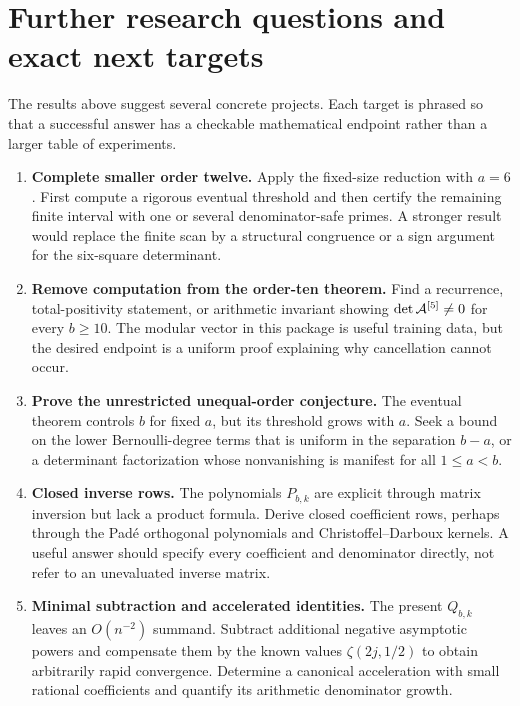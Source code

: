 \section{Further research questions and exact next targets}
\label{sec:research}

The results above suggest several concrete projects.  Each target is
phrased so that a successful answer has a checkable mathematical
endpoint rather than a larger table of experiments.

\begin{enumerate}[label=\textbf{R\arabic*.},leftmargin=*]
\item \textbf{Complete smaller order twelve.}
Apply the fixed-size reduction with $a=6$.  First compute a rigorous
eventual threshold and then certify the remaining finite interval with
one or several denominator-safe primes.  A stronger result would replace
the finite scan by a structural congruence or a sign argument for the
six-square determinant.

\item \textbf{Remove computation from the order-ten theorem.}
Find a recurrence, total-positivity statement, or arithmetic invariant
showing $\det\mathcal{A}^{[5]}\ne0$ for every $b\ge10$.  The modular vector in
this package is useful training data, but the desired endpoint is a
uniform proof explaining why cancellation cannot occur.

\item \textbf{Prove the unrestricted unequal-order conjecture.}
The eventual theorem controls $b$ for fixed $a$, but its threshold grows
with $a$.  Seek a bound on the lower Bernoulli-degree terms that is
uniform in the separation $b-a$, or a determinant factorization whose
nonvanishing is manifest for all $1\le a<b$.

\item \textbf{Closed inverse rows.}
The polynomials $P_{b,k}$ are explicit through matrix inversion but lack
a product formula.  Derive closed coefficient rows, perhaps through the
Pad\'e orthogonal polynomials and Christoffel--Darboux kernels.  A useful
answer should specify every coefficient and denominator directly, not
refer to an unevaluated inverse matrix.

\item \textbf{Minimal subtraction and accelerated identities.}
The present $Q_{b,k}$ leaves an $O(n^{-2})$ summand.  Subtract additional
negative asymptotic powers and compensate them by the known values
$\zeta(2j,1/2)$ to obtain arbitrarily rapid convergence.  Determine a
canonical acceleration with small rational coefficients and quantify
its arithmetic denominator growth.


\end{enumerate}
